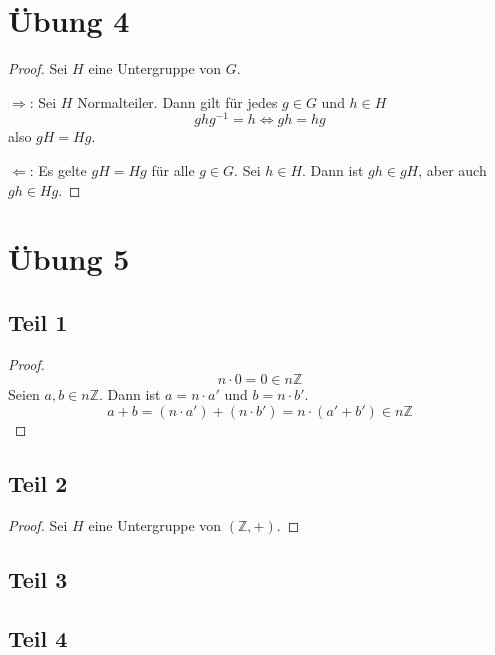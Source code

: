 \documentclass[10pt,a4paper]{article}
\begin{document}
\section{Übung 4}

\begin{proof}
  Sei $H$ eine Untergruppe von $G$.

  $\Rightarrow$:
  Sei $H$ Normalteiler.
  Dann gilt für jedes $g \in G$ und $h \in H$
  \begin{equation}
    ghg^{-1} = h \Leftrightarrow gh = hg
  \end{equation}
  also $gH = Hg$.

  $\Leftarrow$:
  Es gelte $gH = Hg$ für alle $g \in G$.
  Sei $h \in H$.
  Dann ist $gh \in gH$, aber auch $gh \in Hg$.
\end{proof}

\section{Übung 5}

\subsection{Teil 1}

\begin{proof}
  \begin{equation}
    n \cdot 0 = 0 \in n \mathbb{Z}
  \end{equation}
  Seien $a, b \in n \mathbb{Z}$.
  Dann ist $a = n \cdot a'$ und $b = n \cdot b'$.
  \begin{equation}
    a + b = (n \cdot a') + (n \cdot b') = n \cdot (a' + b') \in n \mathbb{Z}
  \end{equation}
\end{proof}

\subsection{Teil 2}

\begin{proof}
  Sei $H$ eine Untergruppe von $(\mathbb{Z}, +)$.

\end{proof}

\subsection{Teil 3}

\subsection{Teil 4}
\end{document}
